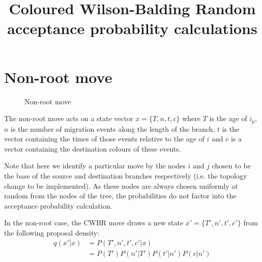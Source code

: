 \documentclass[a4paper,11pt]{article}
\title{Coloured Wilson-Balding Random\\%
acceptance probability calculations}
\begin{document}
\maketitle


\section{Non-root move}

\begin{figure}
\begin{center}
\end{center}
\caption{Non-root move}
\end{figure}

The non-root move acts on a state vector $x=\{T,n,t,c\}$ where $T$ is
the age of $i_p$, $n$ is the number of migration events along the
length of the branch, $t$ is the vector containing the times of those
events relative to the age of $i$ and $c$ is a vector containing the
destination colours of these events.

Note that here we identify a particular move by the nodes $i$ and $j$
chosen to be the base of the source and destination branches
respectively (i.e. the topology change to be implemented). As these
nodes are always chosen uniformly at random from the nodes of the
tree, the probabilities do not factor into the acceptance probability
calculation.

In the non-root case, the CWBR move draws a new state
$x'=\{T',n',t',c'\}$ from the following proposal density:
\begin{align}
  q(x'|x) &= P(T',n',t',c'|x)\nonumber\\
&= P(T')P(n'|T')P(t'|n')P(c|n')
\end{align}
\end{document}
